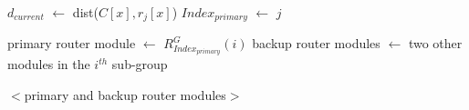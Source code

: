 \begin{algorithm}
\begin{algorithmic}[1]
\\

    \State $d_{current}$ $\leftarrow$ dist($C[x], r_j[x]$) 
        \State $Index_{primary}$ $\leftarrow$ $j$
        \EndIf

\EndFor

    \State primary router module $\leftarrow$ $R^G_{Index_{primary}}(i)$
    \State backup router modules $\leftarrow$ 
     two other modules in the $i^{th}$ sub-group

    \Return $<$primary and backup router modules$>$ \\ 

\label{second:end}

\EndProcedure
\\
\end{algorithmic}
\end{algorithm}

\begin{comment}
With router placement in place, we now face the question that, how does each
client select which router to minimize communication hops as well as to avoid
congestion. This section provides an overview on route selection process and
algorithms. Routers are divided into 9 groups, with each group containing 12
router modules. We denote a router group with a superscript, and a router
module in that group with a subscript. For example, the first module in a
router group $A$ is denoted as $R^A_1$ so on and so forth. The following
algorithm describe the core idea of selection process. The input is a given
router group and client ID, the output is a triple: primary router and two back
up routers.
\end{comment}




